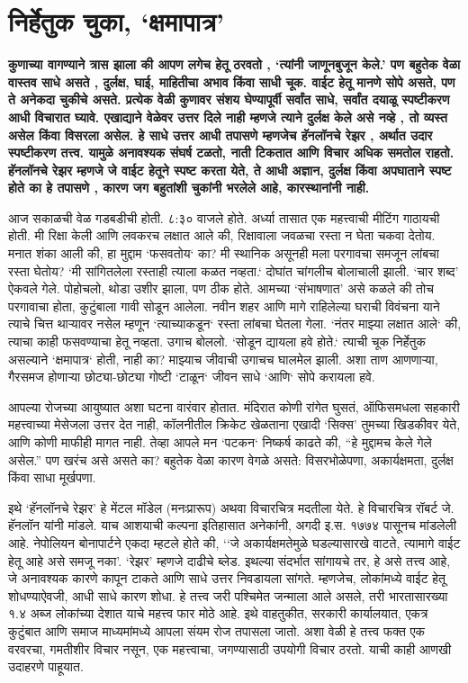 \chapter{निर्हेतुक चुका, ‘क्षमापात्र’}

\textcolor{blue!60!black}{\textbf{कुणाच्या वागण्याने त्रास झाला की आपण लगेच हेतू ठरवतो , ‘त्यांनी जाणूनबुजून केले.’ पण बहुतेक वेळा वास्तव साधे असते , दुर्लक्ष, घाई, माहितीचा अभाव किंवा साधी चूक. वाईट हेतू मानणे सोपे असते, पण ते अनेकदा चुकीचे असते. प्रत्येक वेळी कुणावर संशय घेण्यापूर्वी सर्वांत साधे, सर्वांत दयाळू स्पष्टीकरण आधी विचारात घ्यावे. एखाद्याने वेळेवर उत्तर दिले नाही म्हणजे त्याने दुर्लक्ष केले असे नव्हे , तो व्यस्त असेल किंवा विसरला असेल. हे साधे उत्तर आधी तपासणे म्हणजेच हॅनलॉनचे रेझर , अर्थात उदार स्पष्टीकरण तत्त्व. यामुळे अनावश्यक संघर्ष टळतो, नाती टिकतात आणि विचार अधिक समतोल राहतो. हॅनलॉनचे रेझर म्हणजे जे वाईट हेतूने स्पष्ट करता येते, ते आधी अज्ञान, दुर्लक्ष किंवा अपघाताने स्पष्ट होते का हे तपासणे , कारण जग बहुतांशी चुकांनी भरलेले आहे, कारस्थानांनी नाही.}}

आज सकाळची वेळ गडबडीची होती. ८:३० वाजले होते. अर्ध्या तासात एक महत्त्वाची मीटिंग गाठायची होती. मी रिक्षा केली आणि लवकरच लक्षात आले की, रिक्षावाला जवळचा रस्ता न घेता चकवा देतोय. मनात शंका आली की, हा मुद्दाम `फसवतोय` का? मी स्थानिक असूनही मला परगावचा समजून लांबचा रस्ता घेतोय? `मी सांगितलेला रस्ताही त्याला कळत नव्हता.` दोघांत चांगलीच बोलाचाली झाली. ‘चार शब्द’ ऐकवले गेले. पोहोचलो, थोडा उशीर झाला, पण ठीक होते. आमच्या ‘संभाषणात’ असे कळले की तोच परगावाचा होता, कुटुंबाला गावी सोडून आलेला. नवीन शहर आणि मागे राहिलेल्या घराची विवंचना याने त्याचे चित्त थाऱ्यावर नसेल म्हणून `त्याच्याकडून` रस्ता लांबचा घेतला गेला. `नंतर माझ्या लक्षात आले` की, त्याचा काही फसवण्याचा हेतू नव्हता. उगाच बोललो. `सोडून द्यायला हवे होते.` त्याची चूक निर्हेतुक असल्याने `क्षमापात्र` होती, नाही का? माझ्याच जीवाची उगाचच घालमेल झाली. अशा ताण आणणाऱ्या, गैरसमज होणाऱ्या छोट्या-छोट्या गोष्टी `टाळून` जीवन साधे `आणि` सोपे करायला हवे.

आपल्या रोजच्या आयुष्यात अशा घटना वारंवार होतात. मंदिरात कोणी रांगेत घुसतं, ऑफिसमधला सहकारी महत्त्वाच्या मेसेजला उत्तर देत नाही, कॉलनीतील क्रिकेट खेळताना एखादी ‘सिक्स’ तुमच्या खिडकीवर येते, आणि कोणी माफीही मागत नाही. तेव्हा आपले मन `पटकन` निष्कर्ष काढते की, “हे मुद्दामच केले गेले असेल.” पण खरंच असे असते का? बहुतेक वेळा कारण वेगळे असते: विसरभोळेपणा, अकार्यक्षमता, दुर्लक्ष किंवा साधा मूर्खपणा. 

इथे ‘हॅनलॉनचे रेझर’ हे मेंटल मॉडेल (मनःप्रारूप) अथवा विचारचित्र मदतीला येते. हे विचारचित्र रॉबर्ट जे. हॅनलॉन यांनी मांडले. याच आशयाची कल्पना इतिहासात अनेकांनी, अगदी इ.स. १७७४ पासूनच मांडलेली आहे. नेपोलियन बोनापार्टने एकदा म्हटले होते की, ‘`जे अकार्यक्षमतेमुळे घडल्यासारखे वाटते, त्यामागे वाईट हेतू आहे असे समजू नका’. ‘रेझर’ म्हणजे दाढीचे ब्लेड. इथल्या संदर्भात सांगायचे तर, हे असे तत्त्व आहे, जे अनावश्यक कारणे कापून टाकते आणि साधे उत्तर निवडायला सांगते. म्हणजेच, लोकांमध्ये वाईट हेतू शोधण्याऐवजी, आधी साधे कारण शोधा. हे तत्त्व जरी पश्चिमेत जन्माला आले असले, तरी भारतासारख्या १.४ अब्ज लोकांच्या देशात याचे महत्त्व फार मोठे आहे. इथे वाहतुकीत, सरकारी कार्यालयात, एकत्र कुटुंबात आणि समाज माध्यमांमध्ये आपला संयम रोज तपासला जातो. अशा वेळी हे तत्त्व फक्त एक वरवरचा, गमतीशीर विचार नसून, एक महत्त्वाचा, जगण्यासाठी उपयोगी विचार ठरतो. याची काही आणखी उदाहरणे पाहूयात.

